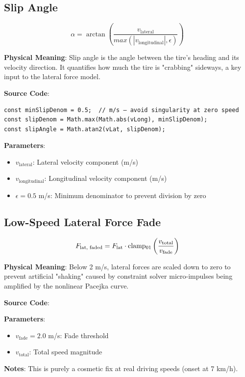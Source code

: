 \subsection{Slip Angle}

\begin{equation}
  \alpha = \arctan\left(\frac{v_{\text{lateral}}}{max(|v_{\text{longitudinal}}|, \epsilon)}\right)
  \label{eq:slip-angle}
\end{equation}

\textbf{Physical Meaning}: Slip angle is the angle between the tire's heading and its velocity direction. It quantifies how much the tire is "crabbing" sideways, a key input to the lateral force model.

\textbf{Source Code}: 

\begin{lstlisting}[caption={Slip angle calculation}]
const minSlipDenom = 0.5;  // m/s — avoid singularity at zero speed
const slipDenom = Math.max(Math.abs(vLong), minSlipDenom);
const slipAngle = Math.atan2(vLat, slipDenom);
\end{lstlisting}

\textbf{Parameters}:
\begin{itemize}
  \item $v_{\text{lateral}}$: Lateral velocity component (m/s)
  \item $v_{\text{longitudinal}}$: Longitudinal velocity component (m/s)
  \item $\epsilon = 0.5$ m/s: Minimum denominator to prevent division by zero
\end{itemize}

\subsection{Low-Speed Lateral Force Fade}

\begin{equation}
  F_{\text{lat, faded}} = F_{\text{lat}} \cdot \operatorname{clamp_{01}}\left(\frac{v_{\text{total}}}{v_{\text{fade}}}\right)
  \label{eq:low-speed-fade}
\end{equation}

\textbf{Physical Meaning}: Below 2 m/s, lateral forces are scaled down to zero to prevent artificial "shaking" caused by constraint solver micro-impulses being amplified by the nonlinear Pacejka curve.

\textbf{Source Code}: 

\textbf{Parameters}:
\begin{itemize}
  \item $v_{\text{fade}} = 2.0$ m/s: Fade threshold
  \item $v_{\text{total}}$: Total speed magnitude
\end{itemize}

\textbf{Notes}: This is purely a cosmetic fix at real driving speeds (onset at 7 km/h).

\newpage
